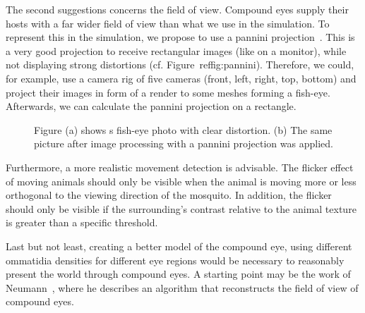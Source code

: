 \documentclass{sig-alternate-05-2015}
\begin{document}
The second suggestions concerns the field of view. Compound eyes supply their hosts with a far wider field of view than what we use in the simulation. To represent this in the simulation, we propose to use a pannini projection~\cite{sharpless2010}. This is a very good projection to receive rectangular images (like on a monitor), while not displaying strong distortions (cf. Figure~ref{fig:pannini}). Therefore, we could, for example, use a camera rig of five cameras (front, left, right, top, bottom) and project their images in form of a render to some meshes forming a fish-eye. Afterwards, we can calculate the pannini projection on a rectangle.

\begin{figure}[ht!]
{}

\caption{Figure (a) shows s fish-eye photo with clear distortion. (b) The same picture after image processing with a pannini projection was applied.}
\label{fig:pannini}
\end{figure}



Furthermore, a more realistic movement detection is advisable. The flicker effect of moving animals should only be visible when the animal is moving more or less orthogonal to the viewing direction of the mosquito. In addition, the flicker should only be visible if the surrounding's contrast relative to the animal texture is greater than a specific threshold.

Last but not least, creating a better model of the compound eye, using different ommatidia densities for different eye regions would be necessary to reasonably present the world through compound eyes. A starting point may be the work of Neumann~\cite{neumann2002}, where he describes an algorithm that reconstructs the field of view of compound eyes.



  
\end{document}
